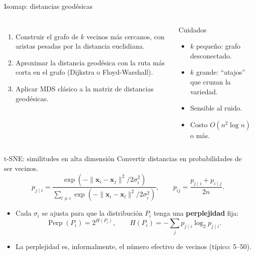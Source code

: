 \documentclass[aspectratio=169,11pt]{beamer}
\newcommand{\x}{\bm{x}}
\newcommand{\z}{\bm{z}}
\begin{document}
\begin{frame}{Isomap: distancias geodésicas}
  \begin{columns}[c]
    \begin{enumerate}
      \item Construir el grafo de $k$ vecinos más cercanos, con aristas pesadas por la distancia euclidiana.
      \item Aproximar la distancia geodésica con la ruta más corta en el grafo (Dijkstra o Floyd-Warshall).
      \item Aplicar MDS clásico a la matriz de distancias geodésicas.
    \end{enumerate}
    \begin{alertblock}{Cuidados}
      \begin{itemize}
        \item $k$ pequeño: grafo desconectado.
        \item $k$ grande: ``atajos'' que cruzan la variedad.
        \item Sensible al ruido.
        \item Costo $O(n^2\log n)$ o más.
      \end{itemize}
    \end{alertblock}
  \end{columns}
  \vspace{8pt}
  \centering
\end{frame}

\begin{frame}{t-SNE: similitudes en alta dimensión}
  Convertir distancias en \alert{probabilidades de ser vecinos}.
  \[
    p_{j\mid i} = \frac{\exp\!\left(-\lVert\x_i-\x_j\rVert^2/2\sigma_i^2\right)}
                       {\sum_{l\neq i}\exp\!\left(-\lVert\x_i-\x_l\rVert^2/2\sigma_i^2\right)},
    \qquad
    p_{ij} = \frac{p_{j\mid i} + p_{i\mid j}}{2n}.
  \]
  \begin{itemize}
    \item Cada $\sigma_i$ se ajusta para que la distribución $P_i$ tenga una
          \textbf{perplejidad} fija:
          \[
            \operatorname{Perp}(P_i) = 2^{H(P_i)}, \qquad
            H(P_i) = -\sum_j p_{j\mid i}\log_2 p_{j\mid i}.
          \]
    \item La perplejidad es, informalmente, el \alert{número efectivo de vecinos} (típico: 5--50).
  \end{itemize}
\end{frame}
\end{document}
